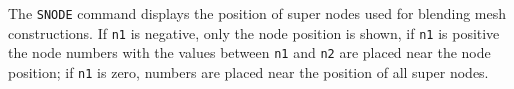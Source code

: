 \headb

The {\tt SNODE} command displays the position of super nodes used
for blending mesh constructions.  If {\tt n1}
is negative, only the node position is shown, if {\tt n1} is positive the
node numbers with the values between {\tt n1} and {\tt n2} are
placed near the node position;
if {\tt n1} is zero, numbers are placed near the position of all super nodes.
\vfill
\eject
